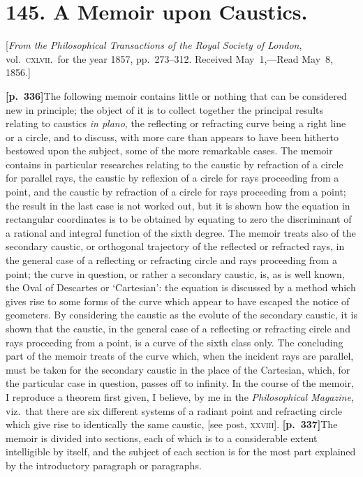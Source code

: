 \documentclass[11pt]{article}
\begin{document}
\vfill

\clearpage
\section*{145. A Memoir upon Caustics.}

\begin{center}
[\textit{From the Philosophical Transactions of the Royal Society of London}, vol.~\textsc{cxlvii.}\ for the year 1857, pp.~273--312. Received May~1,---Read May~8, 1856.]
\end{center}

\medskip

\noindent\textbf{[p.~336]}\quad The following memoir contains little or nothing that can be considered new in principle; the object of it is to collect together the principal results relating to caustics \textit{in plano}, the reflecting or refracting curve being a right line or a circle, and to discuss, with more care than appears to have been hitherto bestowed upon the subject, some of the more remarkable cases. The memoir contains in particular researches relating to the caustic by refraction of a circle for parallel rays, the caustic by reflexion of a circle for rays proceeding from a point, and the caustic by refraction of a circle for rays proceeding from a point; the result in the last case is not worked out, but it is shown how the equation in rectangular coordinates is to be obtained by equating to zero the discriminant of a rational and integral function of the sixth degree. The memoir treats also of the secondary caustic, or orthogonal trajectory of the reflected or refracted rays, in the general case of a reflecting or refracting circle and rays proceeding from a point; the curve in question, or rather a secondary caustic, is, as is well known, the Oval of Descartes or `Cartesian': the equation is discussed by a method which gives rise to some forms of the curve which appear to have escaped the notice of geometers. By considering the caustic as the evolute of the secondary caustic, it is shown that the caustic, in the general case of a reflecting or refracting circle and rays proceeding from a point, is a curve of the sixth class only. The concluding part of the memoir treats of the curve which, when the incident rays are parallel, must be taken for the secondary caustic in the place of the Cartesian, which, for the particular case in question, passes off to infinity. In the course of the memoir, I reproduce a theorem first given, I believe, by me in the \textit{Philosophical Magazine}, viz.\ that there are six different systems of a radiant point and refracting circle which give rise to identically the same caustic, [see post, \textsc{xxviii}]. \textbf{[p.~337]}\quad The memoir is divided into sections, each of which is to a considerable extent intelligible by itself, and the subject of each section is for the most part explained by the introductory paragraph or paragraphs.
\end{document}
